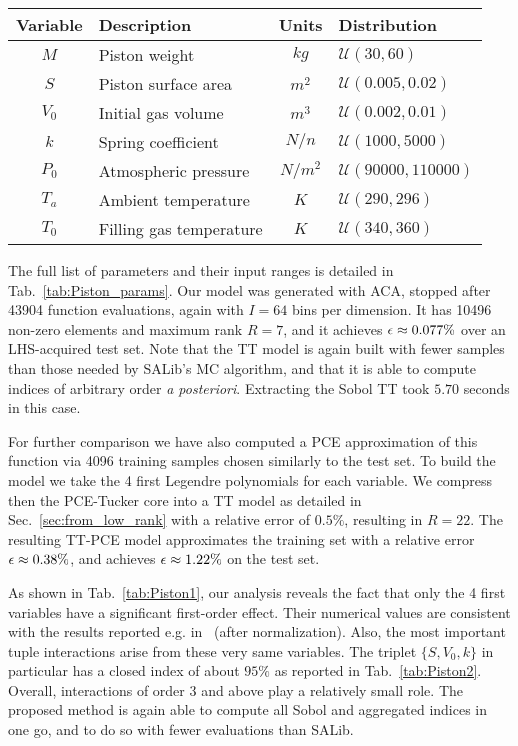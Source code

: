 \documentclass[review, twocolumn]{svjour3}          %
\begin{document}
\begin{table*}[h]
	\centering
	\caption{Parameters of the Piston simulation}
	\begin{tabular}{c l c l}
		\hline
		\textbf{Variable} & \textbf{Description} & \textbf{Units} & \textbf{Distribution} \\
		\hline
		$M$ & Piston weight & ${kg}$ & $\mathcal{U}(30, 60)$ \\
		$S$ & Piston surface area & $m^2$ & $\mathcal{U}(0.005, 0.02)$ \\
		$V_0$ & Initial gas volume & $m^3$ & $\mathcal{U}(0.002, 0.01)$ \\
		$ k$ & Spring coefficient & $N/n$ & $\mathcal{U}(1000, 5000)$ \\
		$P_0$ & Atmospheric pressure & $N/m^2$ & $\mathcal{U}(90000, 110000)$ \\
		$T_a$ & Ambient temperature & $K$ & $\mathcal{U}(290, 296)$ \\
		$T_0$ & Filling gas temperature &$K$ & $\mathcal{U}(340, 360)$ \\
		\hline
	\end{tabular}
	\label{tab:Piston_params}
\end{table*}

The full list of parameters and their input ranges is detailed in Tab.~\ref{tab:Piston_params}. Our model was generated with ACA, stopped after 43904 function evaluations, again with $I = 64$ bins per dimension. It has 10496 non-zero elements and maximum rank $R = 7$, and it achieves $\mbox{$\epsilon$} \approx 0.077\%$ over an LHS-acquired test set. Note that the TT model is again built with fewer samples than those needed by SALib's MC algorithm, and that it is able to compute indices of arbitrary order \emph{a posteriori}. Extracting the Sobol TT took $5.70$ seconds in this case.

For further comparison we have also computed a PCE approximation of this function via 4096 training samples chosen similarly to the test set. To build the model we take the 4 first Legendre polynomials for each variable. We compress then the PCE-Tucker core into a TT model as detailed in Sec.~\ref{sec:from_low_rank} with a relative error of $0.5\%$, resulting in $R = 22$. The resulting TT-PCE model approximates the training set with a relative error $\mbox{$\epsilon$} \approx 0.38\%$, and achieves $\mbox{$\epsilon$} \approx 1.22\%$ on the test set.

As shown in Tab.~\ref{tab:Piston1}, our analysis reveals the fact that only the 4 first variables have a significant first-order effect. Their numerical values are consistent with the results reported e.g. in~\cite{ODC:14} (after normalization). Also, the most important tuple interactions arise from these very same variables. The triplet $\{S, V_0, k\}$ in particular has a closed index of about $95\%$ as reported in Tab.~\ref{tab:Piston2}. Overall, interactions of order 3 and above play a relatively small role. The proposed method is again able to compute all Sobol and aggregated indices in one go, and to do so with fewer evaluations than SALib.
\end{document}
